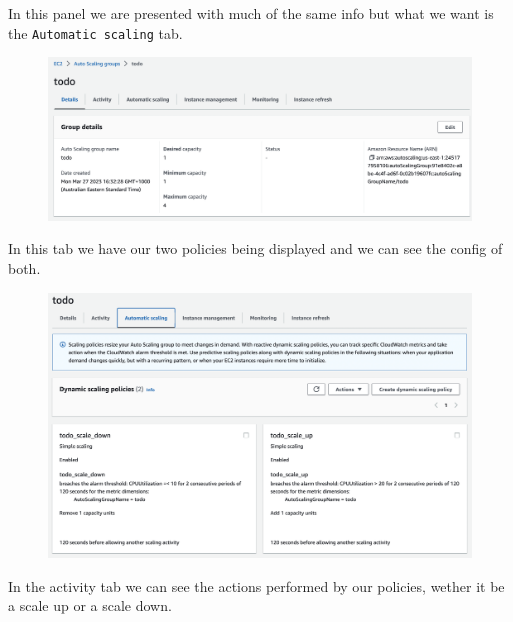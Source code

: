 \documentclass{csse4400}
\begin{document}
In this panel we are presented with much of the same info but what we want is the \texttt{Automatic scaling} tab.

\begin{figure}[H]
  \begin{center}
    \includegraphics[width=\textwidth]{images/ec2_4}
  \end{center}
\end{figure}

In this tab we have our two policies being displayed and we can see the config of both.

\begin{figure}[H]
  \begin{center}
    \includegraphics[width=\textwidth]{images/ec2_5}
  \end{center}
\end{figure}

In the activity tab we can see the actions performed by our policies, wether it be a scale up or a scale down.
\end{document}
